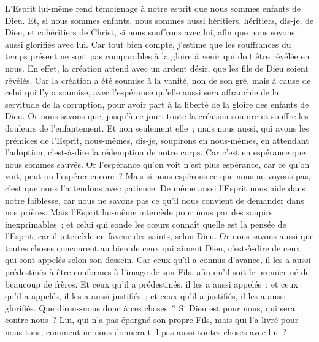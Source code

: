 \begin{multicols}{2}
L'Esprit lui-même rend témoignage à notre esprit que nous sommes enfants de Dieu.
Et, si nous sommes enfants, nous sommes aussi héritiers, héritiers, dis-je, de Dieu, et cohéritiers de Christ, si nous souffrons avec lui, afin que nous soyons aussi glorifiés avec lui.
Car tout bien compté, j'estime que les souffrances du temps présent ne sont pas comparables à la gloire à venir qui doit être révélée en nous.
En effet, la création attend avec un ardent désir, que les fils de Dieu soient révélés.
Car la création a été soumise à la vanité, non de son gré, mais à cause de celui qui l'y a soumise,
avec l'espérance qu'elle aussi sera affranchie de la servitude de la corruption, pour avoir part à la liberté de la gloire des enfants de Dieu.
Or nous savons que, jusqu'à ce jour, toute la création soupire et souffre les douleurs de l'enfantement.
Et non seulement elle~; mais nous aussi, qui avons les prémices de l'Esprit, nous-mêmes, dis-je, soupirons en nous-mêmes, en attendant l'adoption, c'est-à-dire la rédemption de notre corps.
Car c'est en espérance que nous sommes sauvés. Or l'espérance qu'on voit n'est plus espérance, car ce qu'on voit, peut-on l'espérer encore~?
Mais si nous espérons ce que nous ne voyons pas, c'est que nous l'attendons avec patience.
De même aussi l'Esprit nous aide dans notre faiblesse, car nous ne savons pas ce qu'il nous convient de demander dans nos prières. Mais l'Esprit lui-même intercède pour nous par des soupirs inexprimables~;
et celui qui sonde les cœurs connaît quelle est la pensée de l'Esprit, car il intercède en faveur des saints, selon Dieu.
Or nous savons aussi que toutes choses concourent au bien de ceux qui aiment Dieu, c'est-à-dire de ceux qui sont appelés selon son dessein.
Car ceux qu'il a connus d'avance, il les a aussi prédestinés à être conformes à l'image de son Fils, afin qu'il soit le premier-né de beaucoup de frères.
Et ceux qu'il a prédestinés, il les a aussi appelés~; et ceux qu'il a appelés, il les a aussi justifiés~; et ceux qu'il a justifiés, il les a aussi glorifiés.
Que dirons-nous donc à ces choses~? Si Dieu est pour nous, qui sera contre nous~?
Lui, qui n'a pas épargné son propre Fils, mais qui l'a livré pour nous tous, comment ne nous donnera-t-il pas aussi toutes choses avec lui~?

\end{multicols}
